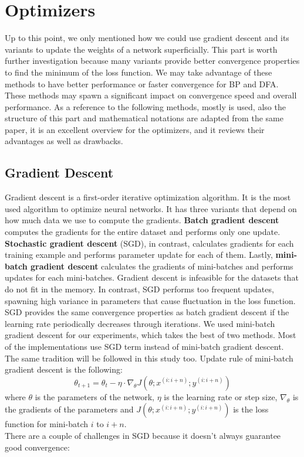 \documentclass[a4paper, nobind]{templates/ociamthesis}
\begin{document}
\hypertarget{optimizers}{%
\section{Optimizers}\label{optimizers}}

Up to this point, we only mentioned how we could use gradient descent and its variants to update the weights of a network superficially. This part is worth further investigation because many variants provide better convergence properties to find the minimum of the loss function. We may take advantage of these methods to have better performance or faster convergence for BP and DFA. These methods may spawn a significant impact on convergence speed and overall performance. As a reference to the following methods, mostly \cite{DBLP:journals/corr/Ruder16} is used, also the structure of this part and mathematical notations are adapted from the same paper, it is an excellent overview for the optimizers, and it reviews their advantages as well as drawbacks.

\hypertarget{gradient-descent}{%
\subsection{Gradient Descent}\label{gradient-descent}}

Gradient descent is a first-order iterative optimization algorithm. It is the most used algorithm to optimize neural networks. It has three variants that depend on how much data we use to compute the gradients. \textbf{Batch gradient descent} computes the gradients for the entire dataset and performs only one update. \textbf{Stochastic gradient descent} (SGD), in contrast, calculates gradients for each training example and performs parameter update for each of them. Lastly, \textbf{mini-batch gradient descent} calculates the gradients of mini-batches and performs updates for each mini-batches.
Gradient descent is infeasible for the datasets that do not fit in the memory. In contrast, SGD performs too frequent updates, spawning high variance in parameters that cause fluctuation in the loss function. SGD provides the same convergence properties as batch gradient descent if the learning rate periodically decreases through iterations. We used mini-batch gradient descent for our experiments, which takes the best of two methods. Most of the implementations use SGD term instead of mini-batch gradient descent. The same tradition will be followed in this study too. Update rule of mini-batch gradient descent is the following:
\[
\theta_{t+1}=\theta_t-\eta \cdot \nabla_{\theta} J\left(\theta ; x^{(i: i+n)} ; y^{(i: i+n)}\right)
\]
where \(\theta\) is the parameters of the network, \(\eta\) is the learning rate or step size, \(\nabla_{\theta}\) is the gradients of the parameters and \(J\left(\theta ; x^{(i: i+n)} ; y^{(i: i+n)}\right)\) is the loss function for mini-batch \(i\) to \(i+n\).\\
There are a couple of challenges in SGD because it doesn't always guarantee good convergence:
\end{document}
